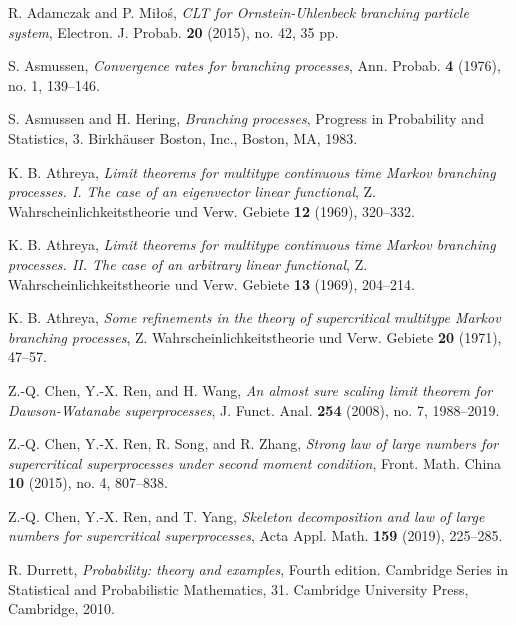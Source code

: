 \documentclass[12pt,a4paper]{amsart}
\theoremstyle{plain}
\theoremstyle{definition}
\numberwithin{equation}{section}
\begin{document}
\begin{thebibliography}{10}

  R. Adamczak and P. Mi{\l}o\'{s}, \emph{C{LT} for {O}rnstein-{U}hlenbeck branching particle system},
  Electron. J. Probab. \textbf{20} (2015), no. 42, 35 pp.

  S. Asmussen, \emph{Convergence rates for branching processes}, 
  Ann. Probab.  \textbf{4} (1976), no. 1, 139--146.

  S. Asmussen and H. Hering, \emph{Branching processes}, 
  Progress in Probability and Statistics, 3. Birkh\"{a}user Boston, Inc., Boston, MA, 1983.

  K. B. Athreya,  
  \emph{Limit theorems for multitype continuous time {M}arkov branching processes. {I}. {T}he case of an eigenvector linear functional}, 
  Z. Wahrscheinlichkeitstheorie und Verw. Gebiete \textbf{12} (1969), 320--332.

  K. B. Athreya, 
  \emph{Limit theorems for multitype continuous time {M}arkov branching processes. {II}. {T}he case of an arbitrary linear functional}, 
  Z. Wahrscheinlichkeitstheorie und Verw. Gebiete \textbf{13} (1969), 204--214.

  K. B. Athreya, 
  \emph{Some refinements in the theory of supercritical multitype {M}arkov branching processes}, 
  Z. Wahrscheinlichkeitstheorie und Verw. Gebiete \textbf{20} (1971), 47--57.

  Z.-Q. Chen, Y.-X. Ren, and H. Wang, 
  \emph{An almost sure scaling limit theorem for {D}awson-{W}atanabe superprocesses}, 
  J. Funct. Anal. \textbf{254} (2008), no. 7, 1988--2019.

   Z.-Q. Chen, Y.-X. Ren, R. Song, and R. Zhang,
   \emph{Strong law of large numbers for supercritical superprocesses under second moment condition}, 
   Front. Math. China \textbf{10} (2015), no. 4, 807--838.

   Z.-Q. Chen, Y.-X. Ren, and T. Yang,
   \emph{Skeleton decomposition and law of large numbers for supercritical superprocesses}, 
   Acta Appl. Math. \textbf{159} (2019), 225--285.

   R. Durrett, 
   \emph{Probability: theory and examples}, 
   Fourth edition. Cambridge Series in Statistical and Probabilistic Mathematics, 31. Cambridge University Press, Cambridge, 2010.


\end{thebibliography}
\end{document}

